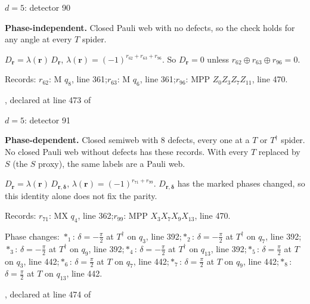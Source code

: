 \label{d5_det090}
{\Large $d=5$: detector 90}\par
\textbf{Phase-independent.} Closed Pauli web with no defects, so the check holds for any angle at every $T$ spider.
\begin{center}
\end{center}
\vspace{-1mm}
$D_{\boldsymbol r}=\lambda(\boldsymbol r)\,D_{\boldsymbol r}$, \quad $\lambda(\boldsymbol r)=(-1)^{r_{62}+r_{63}+r_{96}}$. \qquad So $D_{\boldsymbol r}=0$ unless $r_{62}\oplus r_{63}\oplus r_{96}=0$.
\par\smallskip\begin{minipage}{.98\linewidth}\small Records: $r_{62}$: M $q_{8}$, line 361;\quad $r_{63}$: M $q_{6}$, line 361;\quad $r_{96}$: MPP $Z_{0}Z_{3}Z_{7}Z_{11}$, line 470.\end{minipage}
\vfill
{\footnotesize\texttt{}, declared at line 473 of \texttt{}}
\newpage

\label{d5_det091}
{\Large $d=5$: detector 91}\par
\textbf{Phase-dependent.} Closed semiweb with 8 defects, every one at a $T$ or $T^\dagger$ spider. No closed Pauli web without defects has these records. With every $T$ replaced by $S$ (the $S$ proxy), the same labels are a Pauli web.
\begin{center}
\end{center}
\vspace{-1mm}
$D_{\boldsymbol r}=\lambda(\boldsymbol r)\,D_{\boldsymbol r,\boldsymbol\delta}$, \quad $\lambda(\boldsymbol r)=(-1)^{r_{71}+r_{99}}$. \qquad $D_{\boldsymbol r,\boldsymbol\delta}$ has the marked phases changed, so this identity alone does not fix the parity.
\par\smallskip\begin{minipage}{.98\linewidth}\small Records: $r_{71}$: MX $q_{4}$, line 362;\quad $r_{99}$: MPP $X_{3}X_{7}X_{9}X_{13}$, line 470.\end{minipage}
\par\smallskip\begin{minipage}{.98\linewidth}\small Phase changes: $\ast_{1}$: $\delta=-\frac{\pi}{2}$ at $T^\dagger$ on $q_{3}$, line 392;\quad $\ast_{2}$: $\delta=-\frac{\pi}{2}$ at $T^\dagger$ on $q_{7}$, line 392;\quad $\ast_{3}$: $\delta=-\frac{\pi}{2}$ at $T^\dagger$ on $q_{9}$, line 392;\quad $\ast_{4}$: $\delta=-\frac{\pi}{2}$ at $T^\dagger$ on $q_{13}$, line 392;\quad $\ast_{5}$: $\delta=\frac{\pi}{2}$ at $T$ on $q_{3}$, line 442;\quad $\ast_{6}$: $\delta=\frac{\pi}{2}$ at $T$ on $q_{7}$, line 442;\quad $\ast_{7}$: $\delta=\frac{\pi}{2}$ at $T$ on $q_{9}$, line 442;\quad $\ast_{8}$: $\delta=\frac{\pi}{2}$ at $T$ on $q_{13}$, line 442.\end{minipage}
\vfill
{\footnotesize\texttt{}, declared at line 474 of \texttt{}}
\newpage

